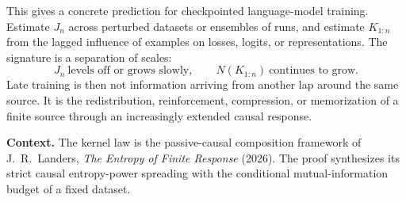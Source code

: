 \documentclass[10pt]{article}
\theoremstyle{compact}
\newcommand{\EP}{N}
\begin{document}
This gives a concrete prediction for checkpointed language-model training. Estimate $J_n$ across perturbed datasets or ensembles of runs, and estimate $K_{1:n}$ from the lagged influence of examples on losses, logits, or representations. The signature is a separation of scales:
\[
J_n\ \text{levels off or grows slowly},
\qquad
\EP(K_{1:n})\ \text{continues to grow}.
\]
Late training is then not information arriving from another lap around the same source. It is the redistribution, reinforcement, compression, or memorization of a finite source through an increasingly extended causal response.

\vfill
{\footnotesize\textbf{Context.} The kernel law is the passive-causal composition framework of J.~R.~Landers, \emph{The Entropy of Finite Response} (2026). The proof synthesizes its strict causal entropy-power spreading with the conditional mutual-information budget of a fixed dataset.}
\end{document}
